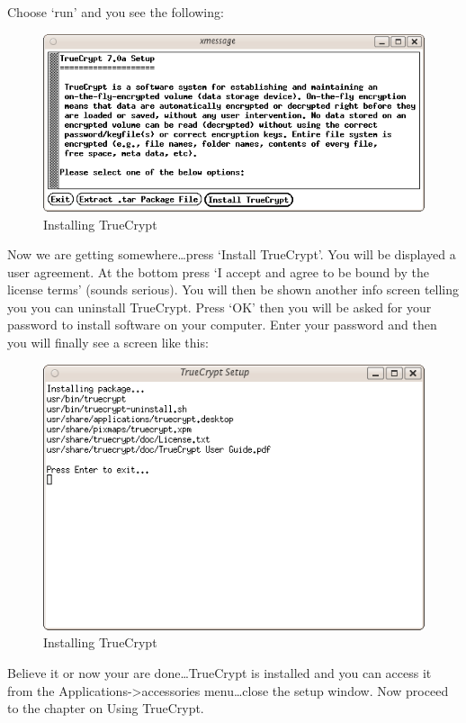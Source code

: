 Choose `run' and you see the following:

\begin{figure}[htbp]
\centering
\includegraphics{tc_007.png}
\caption{Installing TrueCrypt}
\end{figure}

Now we are getting somewhere\ldots{}press `Install TrueCrypt'. You will
be displayed a user agreement. At the bottom press `I accept and agree
to be bound by the license terms' (sounds serious). You will then be
shown another info screen telling you you can uninstall TrueCrypt. Press
`OK' then you will be asked for your password to install software on
your computer. Enter your password and then you will finally see a
screen like this:

\begin{figure}[htbp]
\centering
\includegraphics{tc_008.png}
\caption{Installing TrueCrypt}
\end{figure}

Believe it or now your are done\ldots{}TrueCrypt is installed and you
can access it from the Applications-\textgreater{}accessories
menu\ldots{}close the setup window. Now proceed to the chapter on Using
TrueCrypt.


